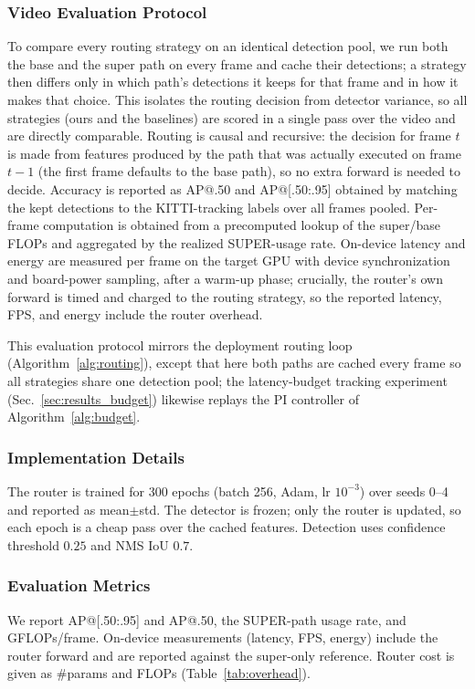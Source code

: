 \subsubsection{Video Evaluation Protocol}
To compare every routing strategy on an identical detection pool, we run both the base and the super path on every frame and cache their detections; a strategy then differs only in which path's detections it keeps for that frame and in how it makes that choice. 
This isolates the routing decision from detector variance, so all strategies (ours and the baselines) are scored in a single pass over the video and are directly comparable. 
Routing is causal and recursive: the decision for frame $t$ is made from features produced by the path that was actually executed on frame $t{-}1$ (the first frame defaults to the base path), so no extra forward is needed to decide. 
Accuracy is reported as AP@.50 and AP@[.50:.95] obtained by matching the kept detections to the KITTI-tracking labels over all frames pooled.
Per-frame computation is obtained from a precomputed lookup of the super/base FLOPs and aggregated by the realized SUPER-usage rate. 
On-device latency and energy are measured per frame on the target GPU with device synchronization and board-power sampling, after a warm-up phase; crucially, the router's own forward is timed and charged to the routing strategy, so the reported latency, FPS, and energy
include the router overhead.

This evaluation protocol mirrors the deployment routing loop
(Algorithm~\ref{alg:routing}), except that here both paths are cached every frame
so all strategies share one detection pool; the latency-budget tracking experiment
(Sec.~\ref{sec:results_budget}) likewise replays the PI controller of
Algorithm~\ref{alg:budget}.


\subsubsection{Implementation Details}
\label{sec:setup_impl}
The router is trained for 300 epochs (batch 256, Adam, lr $10^{-3}$) over seeds 0--4
and reported as mean$\pm$std. 
The detector is frozen; only the router is updated, so
each epoch is a cheap pass over the cached features. 
Detection uses confidence threshold $0.25$ and NMS IoU $0.7$.


 
\subsubsection{Evaluation Metrics}
\label{sec:setup_metrics}
We report AP@[.50:.95] and AP@.50, the SUPER-path usage rate, and GFLOPs/frame.
On-device measurements (latency, FPS, energy) include the router forward and are
reported against the super-only reference. Router cost is given as \#params and
FLOPs (Table~\ref{tab:overhead}).
 
